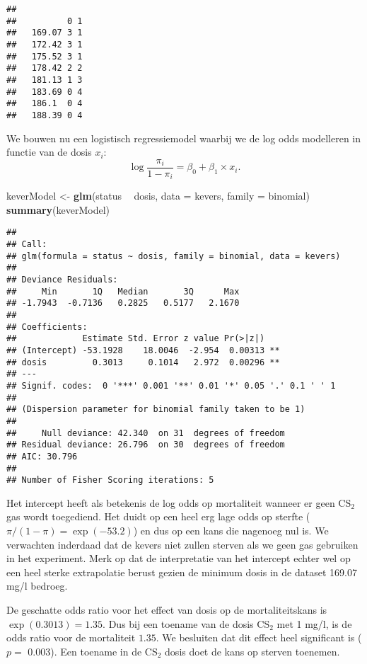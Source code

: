 \documentclass[12pt,dutch,coursenotes]{book}
\newenvironment{Shaded}{\begin{snugshade}}{\end{snugshade}}
\newcommand{\KeywordTok}[1]{\textcolor[rgb]{0.13,0.29,0.53}{\textbf{#1}}}
\newcommand{\DataTypeTok}[1]{\textcolor[rgb]{0.13,0.29,0.53}{#1}}
\newcommand{\StringTok}[1]{\textcolor[rgb]{0.31,0.60,0.02}{#1}}
\newcommand{\OperatorTok}[1]{\textcolor[rgb]{0.81,0.36,0.00}{\textbf{#1}}}
\newcommand{\NormalTok}[1]{#1}
\theoremstyle{definition}
\theoremstyle{definition}
\theoremstyle{definition}
\theoremstyle{remark}
\begin{document}
\begin{verbatim}
##         
##          0 1
##   169.07 3 1
##   172.42 3 1
##   175.52 3 1
##   178.42 2 2
##   181.13 1 3
##   183.69 0 4
##   186.1  0 4
##   188.39 0 4
\end{verbatim}

We bouwen nu een logistisch regressiemodel waarbij we de log odds
modelleren in functie van de dosis \(x_i\):
\[\log \frac{\pi_i}{1-\pi_i}=\beta_0+\beta_1 \times x_i.\]

\begin{Shaded}
\begin{Highlighting}[]
\NormalTok{keverModel <-}\StringTok{ }\KeywordTok{glm}\NormalTok{(status }\OperatorTok{~}\StringTok{ }\NormalTok{dosis, }\DataTypeTok{data =}\NormalTok{ kevers, }\DataTypeTok{family =}\NormalTok{ binomial)}
\KeywordTok{summary}\NormalTok{(keverModel)}
\end{Highlighting}
\end{Shaded}

\begin{verbatim}
## 
## Call:
## glm(formula = status ~ dosis, family = binomial, data = kevers)
## 
## Deviance Residuals: 
##     Min       1Q   Median       3Q      Max  
## -1.7943  -0.7136   0.2825   0.5177   2.1670  
## 
## Coefficients:
##             Estimate Std. Error z value Pr(>|z|)   
## (Intercept) -53.1928    18.0046  -2.954  0.00313 **
## dosis         0.3013     0.1014   2.972  0.00296 **
## ---
## Signif. codes:  0 '***' 0.001 '**' 0.01 '*' 0.05 '.' 0.1 ' ' 1
## 
## (Dispersion parameter for binomial family taken to be 1)
## 
##     Null deviance: 42.340  on 31  degrees of freedom
## Residual deviance: 26.796  on 30  degrees of freedom
## AIC: 30.796
## 
## Number of Fisher Scoring iterations: 5
\end{verbatim}

Het intercept heeft als betekenis de log odds op mortaliteit wanneer er
geen \(\text{CS}_2\) gas wordt toegediend. Het duidt op een heel erg
lage odds op sterfte (\(\pi/(1-\pi)=\exp(-53.2)\)) en dus op een kans
die nagenoeg nul is. We verwachten inderdaad dat de kevers niet zullen
sterven als we geen gas gebruiken in het experiment. Merk op dat de
interpretatie van het intercept echter wel op een heel sterke
extrapolatie berust gezien de minimum dosis in de dataset 169.07 mg/l
bedroeg.

De geschatte odds ratio voor het effect van dosis op de mortaliteitskans
is \(\exp(0.3013)=1.35\). Dus bij een toename van de dosis CS\(_2\) met
1 mg/l, is de odds ratio voor de mortaliteit \(1.35\). We besluiten dat
dit effect heel significant is (\(p=\) 0.003). Een toename in de
CS\(_2\) dosis doet de kans op sterven toenemen.
\end{document}
